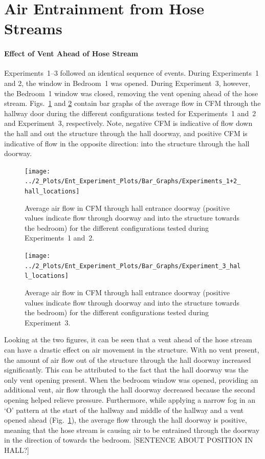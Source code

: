 \documentclass[12pt,oneside]{book}
\begin{document}
\section*{Air Entrainment from Hose Streams}

\paragraph{Effect of Vent Ahead of Hose Stream} \mbox{}

Experiments~1--3 followed an identical sequence of events. During Experiments~1 and 2, the window in Bedroom~1 was opened. During Experiment~3, however, the Bedroom~1 window was closed, removing the vent opening ahead of the hose stream. Figs.~\ref{fig:Exps1_and_2_bar_graph} and \ref{fig:Exp3_bar_graph} contain bar graphs of the average flow in CFM through the hallway door during the different configurations tested for Experiments~1 and~2 and Experiment~3, respectively. Note, negative CFM is indicative of flow down the hall and out the structure through the hall doorway, and positive CFM is indicative of flow in the opposite direction: into the structure through the hall doorway.

\begin{figure}[!ht]
	\centering
	\texttt{[image: ../2\_Plots/Ent\_Experiment\_Plots/Bar\_Graphs/Experiments\_1+2\_hall\_locations]}
	\caption{Average air flow in CFM through hall entrance doorway (positive values indicate flow through doorway and into the structure towards the bedroom) for the different configurations tested during Experiments~1 and~2.}
	\label{fig:Exps1_and_2_bar_graph}
\end{figure}

\begin{figure}[!ht]
	\centering
	\texttt{[image: ../2\_Plots/Ent\_Experiment\_Plots/Bar\_Graphs/Experiment\_3\_hall\_locations]}
	\caption{Average air flow in CFM through hall entrance doorway (positive values indicate flow through doorway and into the structure towards the bedroom) for the different configurations tested during Experiment~3.}
	\label{fig:Exp3_bar_graph}
\end{figure}

Looking at the two figures, it can be seen that a vent ahead of the hose stream can have a drastic effect on air movement in the structure. With no vent present, the amount of air flow out of the structure through the hall doorway increased significantly. This can be attributed to the fact that the hall doorway was the only vent opening present. When the bedroom window was opened, providing an additional vent, air flow through the hall doorway decreased because the second opening helped relieve pressure. Furthermore, while applying a narrow fog in an `O' pattern at the start of the hallway and middle of the hallway and a vent opened ahead (Fig.~\ref{fig:Exps1_and_2_bar_graph}), the average flow through the hall doorway is positive, meaning that the hose stream is causing air to be entrained through the doorway in the direction of towards the bedroom. [SENTENCE ABOUT POSITION IN HALL?]
\end{document}

